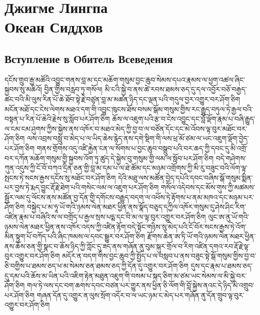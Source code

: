 \normalsize
\section{Джигме Лингпа \\Океан Сиддхов}

\subsection{Вступление в Обитель Всеведения}

\ti
དངོས་གྲུབ་རྒྱ་མཚོའི་འབྱུང་གནས་བླ་མ་དང་མཆོག་གསུམ་བྱང་ཆུབ་སེམས་དཔའ་རྣམས་ལ་ཕྱག་འཚལ་ཞིང་སྐྱབས་སུ་མཆིའོ།
བྱིན་གྱིས་བརླབ་ཏུ་གསོལ།
མི་ངའི་སྐྱེ་བ་ནས་ཚེ་རབས་ཐམས་ཅད་དུ་དལ་འབྱོར་བཅོ་བརྒྱད་ཚང་བའི་མི་ལུས་རིན་པོ་ཆེ་ཐོབ་སྟེ་རྗེ་བཙུན་བླ་མ་མཚན་ཉིད་དང་ལྡན་པའི་གདུལ་བྱར་འགྱུར་བར་ཤོག་ཅིག
མངོན་མཐོ་དང་ངེས་ལེགས་མཐའ་དག་གི་འབྱུང་ཁུངས་ཐོས་བསམ་སྒོམ་གསུམ་གྱིས་རང་རྒྱུད་བཏུལ་ཏེ་རྒྱལ་བའི་བསྟན་པ་རིན་པོ་ཆེའི་རྗེས་སུ་སློབ་པར་ཤོག་ཅིག
ཆོས་ལ་འཇུག་པའི་རྩ་བ་ངེས་འབྱུང་དང་བློ་ལྡོག་རྣམ་པ་བཞི་རྒྱུད་ལ་ངམ་ངམ་ཤུགས་ཀྱིས་སྐྱེས་ནས་འཁོར་བ་མཐའ་མེད་ཀྱི་བྱ་བ་ལ་བཙོན་དོང་དང་མེ་འོབས་ལྟ་བུར་མཐོང་བར་ཤོག་ཅིག
ལས་འབྲས་བསླུ་བ་མེད་པ་ལ་ཡིད་ཆེས་རྙེད་ནས་དགེ་སྡིག་གི་ལས་ཕྲ་མོ་ཙམ་ལ་ཡང་འཇུག་ལྡོག་བྱེད་པར་ཤོག་ཅིག
གནས་གྲོགས་འདུ་འཛི་རྐྱེན་ངན་ལ་སོགས་པ་བྱང་ཆུབ་བསྒྲུབ་པའི་བར་ཆད་ཀྱི་དབང་དུ་མི་འགྲོ་བར་དཀོན་མཆོག་གསུམ་གྱི་སྐྱབས་འོག་ཏུ་ཚུད་དེ་སྐྱེས་བུ་གསུམ་གྱི་ལམ་ལ་སློབ་པར་ཤོག་ཅིག
བདེ་གཤེགས་ཀུན་འདུས་ཀྱི་ངོ་བོ་བཀའ་དྲིན་ཅན་གྱི་བླ་མ་དམ་པ་ལ་ཐེ་ཚོམ་དང་མཉམ་འགྲོགས་ཀྱི་མི་རུ་བཟུང་བའི་ལོག་ལྟ་སྤངས་ཏེ་སངས་རྒྱས་དངོས་སུ་མཐོང་བར་ཤོག་ཅིག
དེའི་མཐུ་ལས་མཚོན་བྱེད་དཔེའི་དབང་བཞིས་སྒོ་གསུམ་སྨིན་པར་བྱས་ཏེ་རྨད་བྱུང་རྡོ་རྗེ་ཐེག་པའི་གསེང་ལམ་ལ་འཇུག་པར་ཤོག་ཅིག
གསོལ་འདེབས་དང་མོས་གུས་ཀྱི་མཚམས་སྦྱོར་ལམ་དུ་ལོངས་ནས་མཚོན་བྱ་དོན་གྱི་དགོངས་བརྒྱུད་བདག་ལ་འཕོས་ཏེ་རྟོགས་པ་ནམ་མཁའ་དང་མཉམ་པར་ཤོག་ཅིག
བསྐྱེད་པ་མ་ཧཱ་ཡོ་གའི་ཉམས་ལེན་མཐར་ཕྱིན་ནས་སྣོད་བཅུད་དཀྱིལ་འཁོར་གསུམ་དུ་ཤེས་ཤིང་རིག་འཛིན་རྣམ་པ་བཞིའི་ས་ལ་བགྲོད་པ་རྒྱལ་སྲས་པདྨ་དང་བི་མ་ལ་ལྟ་བུར་འགྱུར་བར་ཤོག་ཅིག
ལུང་ཨ་ནུ་ཡོ་གའི་ཉམས་ལེན་མཐར་ཕྱིན་ནས་འཁོར་འདས་ཀྱི་འཛིན་རྟོག་བདེ་སྟོང་གཉིས་སུ་མེད་པའི་ངོ་བོར་སངས་རྒྱས་ཏེ་འོག་མིན་སྟུག་པོ་བཀོད་པའི་ཞིང་ཁམས་ལ་དབང་སྒྱུར་བར་ཤོག་ཅིག
རྫོགས་ཆེན་ཨ་ཏི་ཡོ་གའི་ཉམས་ལེན་མཐར་ཕྱིན་ནས་ཆོས་ཅན་གྱི་སྣང་བ་ཆོས་ཉིད་ཀྱི་ཀློང་དུ་ཟད་ནས་གཞོན་ནུ་བུམ་སྐུར་གྲོལ་བ་རིག་འཛིན་དགའ་རབ་རྡོ་རྗེ་ལྟ་བུར་འགྱུར་བར་ཤོག་ཅིག
མདོར་ན་བདག་གིས་བྱང་ཆུབ་ཀྱི་སྤྱོད་པ་ལ་བསླབ་པ་ནས་བཟུང་སྟེ་སྒོ་གསུམ་གྱིས་བྱ་བ་ཅི་བགྱིས་པ་ཐམས་ཅད་ཕ་མ་སེམས་ཅན་ཐམས་ཅད་ཀྱི་དོན་དུ་འགྱུར་བར་ཤོག་ཅིག
དུས་དང་རྣམ་པ་ཐམས་ཅད་དུ་དམ་པའི་ཆོས་མ་ཡིན་པའི་འཇིག་རྟེན་མཐུན་འཇུག་གི་བསམ་པ་སྐད་ཅིག་མ་ཙམ་ཡང་སེམས་ལ་མི་སྐྱེ་བར་ཤོག་ཅིག
གལ་ཏེ་ལས་དང་བག་ཆགས་དབང་བཙན་པར་གྱུར་ནས་ཕྱིན་ཅི་ལོག་གི་བློ་སྐྱེས་ནའང་དེ་ཉིད་མི་འགྲུབ་པར་ཤོག་ཅིག
གཞན་དོན་དུ་འགྱུར་ན་ལུས་སྲོག་འདོར་བ་ལ་ཡང་ཉམ་ང་མེད་པར་གཞོན་ནུ་དོན་གྲུབ་ལྟ་བུར་འགྱུར་བར་ཤོག་ཅིག
